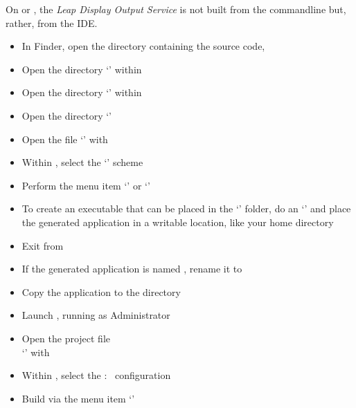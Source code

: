 \tertiaryEnd
\secondaryEnd
{}
On \mac{} or \win, the \textit{Leap Display Output Service} is not built from the
command\longDash{}line but, rather, from the IDE.
\begin{itemize}
\item In Finder, open the directory containing the \mplusm{} source code,
\item\exSp{}Open the directory `' within 
\item\exSp{}Open the directory `' within
\item\exSp{}Open the directory `'
\item\exSp{}Open the file `' with
\item\exSp{}Within , select the `'
scheme
\item\exSp{}Perform the menu item `' or
`'
\item\exSp{}To create an executable that can be placed in the `'
folder, do an `'
and place the generated application in a writable location, like your home directory
\item\exSp{}Exit from 
\item\exSp{}If the generated application is named
, rename it to\\
\item\exSp{}Copy the  application to the
 directory
\end{itemize}
\tertiaryEnd
{}
\begin{itemize}
\item Launch , running as Administrator
\item\exSp{}Open the project file\\
`'
with 
\item\exSp{}Within , select the  :\ 
configuration
\item\exSp{}Build via the menu item `'
\end{itemize}
